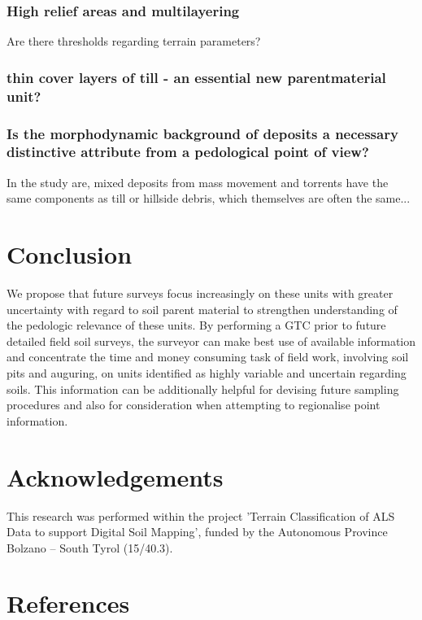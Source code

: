 \documentclass[preprint,12pt,authoryear]{elsarticle}
\begin{document}
\subsubsection{High relief areas and multilayering}
Are there thresholds regarding terrain parameters?
\subsubsection{thin cover layers of till - an essential new parentmaterial unit?}

\subsubsection{Is the morphodynamic background of deposits a necessary distinctive attribute from a pedological point of view?}
In the study are, mixed deposits from mass movement and torrents have the same components as till or hillside debris, which themselves are often the same...

\section{Conclusion}
We propose that future surveys focus increasingly on these units with greater uncertainty with regard to soil parent material to strengthen understanding of the pedologic relevance of these units. By performing a GTC prior to future detailed field soil surveys, the surveyor can make best use of available information and concentrate the time and money consuming task of field work, involving soil pits and auguring, on units identified as highly variable and uncertain regarding soils. This information can be additionally helpful for devising future sampling procedures and also for consideration when attempting to regionalise point information.

\section*{Acknowledgements} This research was performed within the project 'Terrain Classification of ALS Data to support Digital Soil Mapping', funded by the Autonomous Province Bolzano -- South Tyrol (15/40.3).

\section*{References}

\end{document}

